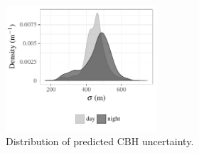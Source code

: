 \documentclass[essd,manuscript]{copernicus}\usepackage[]{graphicx}\usepackage[]{color}
\newenvironment{knitrout}{}{} %
\begin{document}
\begin{figure}
  \centering
\begin{knitrout}
\color{fgcolor}

{\centering \includegraphics[width=0.5\textwidth]{figure/method-cbase-rmse-1} 

}



\end{knitrout}
  \caption{Distribution of predicted CBH uncertainty.}
  \label{fig:uncertainty}
\end{figure}
\end{document}
